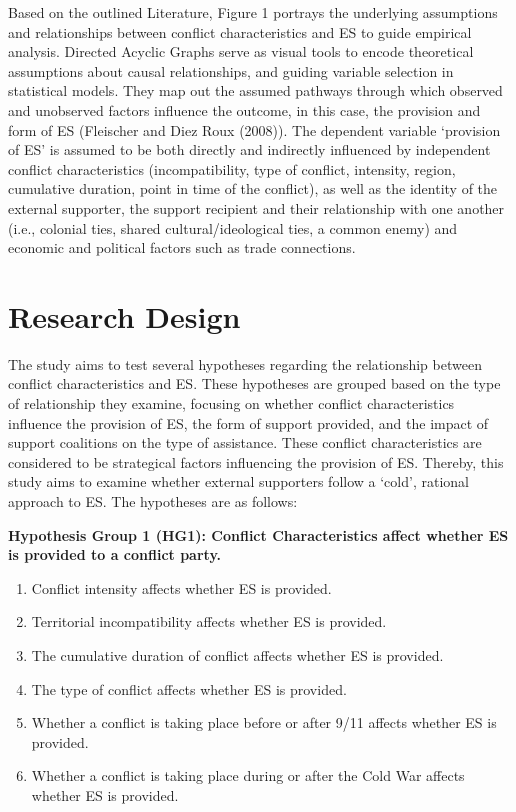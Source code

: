 \documentclass[
]{article}
\begin{document}
\begin{landscape}
\begin{figure}[htbp!]
\end{figure}
\end{landscape}

Based on the outlined Literature, Figure 1 portrays the underlying
assumptions and relationships between conflict characteristics and ES to
guide empirical analysis. Directed Acyclic Graphs serve as visual tools
to encode theoretical assumptions about causal relationships, and
guiding variable selection in statistical models. They map out the
assumed pathways through which observed and unobserved factors influence
the outcome, in this case, the provision and form of ES (Fleischer and
Diez Roux (2008)). The dependent variable `provision of ES' is assumed
to be both directly and indirectly influenced by independent conflict
characteristics (incompatibility, type of conflict, intensity, region,
cumulative duration, point in time of the conflict), as well as the
identity of the external supporter, the support recipient and their
relationship with one another (i.e., colonial ties, shared
cultural/ideological ties, a common enemy) and economic and political
factors such as trade connections.

\section{Research Design}\label{research-design}

The study aims to test several hypotheses regarding the relationship
between conflict characteristics and ES. These hypotheses are grouped
based on the type of relationship they examine, focusing on whether
conflict characteristics influence the provision of ES, the form of
support provided, and the impact of support coalitions on the type of
assistance. These conflict characteristics are considered to be
strategical factors influencing the provision of ES. Thereby, this study
aims to examine whether external supporters follow a `cold', rational
approach to ES. The hypotheses are as follows:

\textbf{Hypothesis Group 1 (HG1): Conflict Characteristics affect
whether ES is provided to a conflict party.}

\begin{enumerate}
\def\labelenumi{\alph{enumi})}
\item
  Conflict intensity affects whether ES is provided.
\item
  Territorial incompatibility affects whether ES is provided.
\item
  The cumulative duration of conflict affects whether ES is provided.
\item
  The type of conflict affects whether ES is provided.
\item
  Whether a conflict is taking place before or after 9/11 affects
  whether ES is provided.
\item
  Whether a conflict is taking place during or after the Cold War
  affects whether ES is provided.
\end{enumerate}
\end{document}
